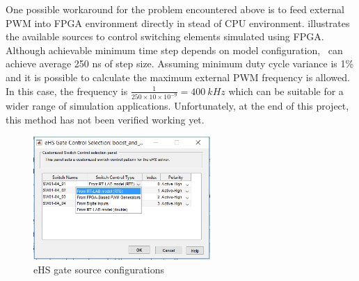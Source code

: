 One possible workaround for the problem encountered above is to feed external \gls{PWM} into \gls{FPGA} environment directly in stead of \gls{CPU} environment.  illustrates the available sources to control switching elements simulated using \gls{FPGA}. Although achievable minimum time step depends on model configuration, \ehs~can achieve average 250 ns of step size. Assuming minimum duty cycle variance is 1\% and it is possible to calculate the maximum external \gls{PWM} frequency is allowed. In this case, the frequency is $\frac{1}{250 \times 10 \times 10^{-9}}=400\ kHz$ which can be suitable for a wider range of simulation applications. Unfortunately, at the end of this project, this method has not been verified working yet. 
\begin{figure}[h]
     \centering
     \includegraphics[width = 0.6\textwidth]{figures/fpga_digital}
     \caption{eHS gate source configurations}
     \label{fig:fpga_digital}
\end{figure}
